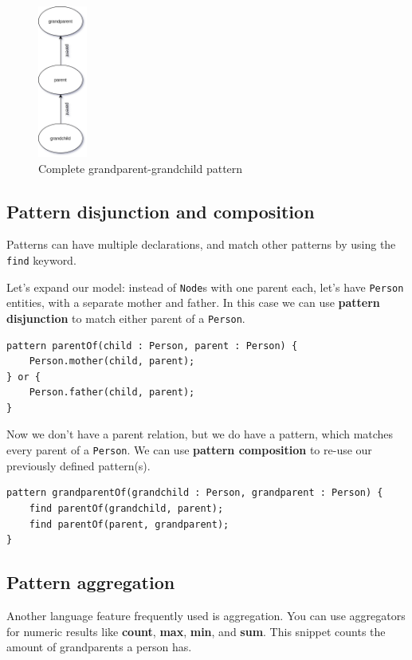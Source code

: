 \documentclass[11pt,a4paper,oneside]{report}
\begin{document}
\begin{figure}[!htbp]
\centering
\includegraphics[height=50mm, keepaspectratio]{figures/basic-pattern-explanation-3.png}
\caption{Complete grandparent-grandchild pattern}
\label{fig:basic-pattern-explanation-3}
\end{figure}

\subsection{Pattern disjunction and composition}
Patterns can have multiple declarations, and match other patterns by using the
\texttt{find} keyword.

Let's expand our model: instead of \texttt{Node}s with one parent each, let's
have \texttt{Person} entities, with a separate mother and father. In this case
we can use \textbf{pattern disjunction} to match either parent of a
\texttt{Person}.

\begin{lstlisting}[frame=single]
pattern parentOf(child : Person, parent : Person) {
    Person.mother(child, parent);
} or {
    Person.father(child, parent);
}
\end{lstlisting}

Now we don't have a parent relation, but we do have a pattern, which matches
every parent of a \texttt{Person}. We can use \textbf{pattern composition} to
re-use our previously defined pattern(s).

\begin{lstlisting}[frame=single]
pattern grandparentOf(grandchild : Person, grandparent : Person) {
    find parentOf(grandchild, parent);
    find parentOf(parent, grandparent);
}
\end{lstlisting}

\subsection{Pattern aggregation}
Another language feature frequently used is aggregation. You can use
aggregators for numeric results like \textbf{count}, \textbf{max}, \textbf{min},
and \textbf{sum}. This snippet counts the amount of grandparents a person has.
\end{document}
